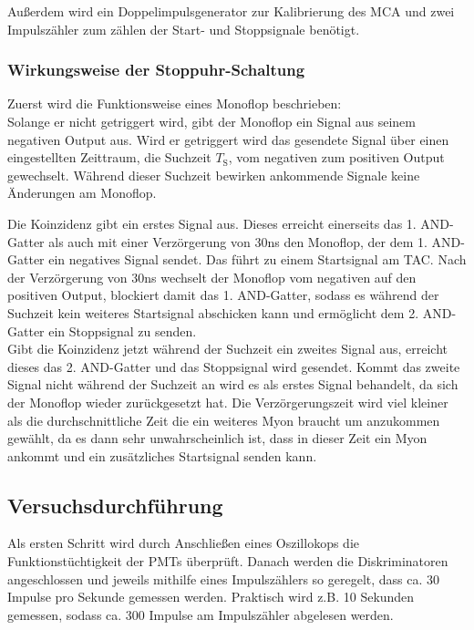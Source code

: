         Außerdem wird ein Doppelimpulsgenerator zur Kalibrierung des MCA und zwei Impulszähler zum zählen der Start- und Stoppsignale benötigt.

    \subsubsection*{Wirkungsweise der Stoppuhr-Schaltung}
        Zuerst wird die Funktionsweise eines Monoflop beschrieben: \\
        Solange er nicht getriggert wird, gibt der Monoflop ein Signal aus seinem negativen Output aus.
        Wird er getriggert wird das gesendete Signal über einen eingestellten Zeittraum, die Suchzeit $T_{\text{S}}$, vom negativen zum positiven Output gewechselt. Während dieser Suchzeit bewirken ankommende Signale keine Änderungen am Monoflop.

        Die Koinzidenz gibt ein erstes Signal aus. Dieses erreicht einerseits das 1. AND-Gatter als auch mit einer Verzörgerung von $30$ns den Monoflop, der dem 1. AND-Gatter ein negatives Signal sendet. Das führt zu einem Startsignal am TAC. Nach der Verzörgerung von $30$ns wechselt der Monoflop vom negativen auf den positiven Output, blockiert damit das 1. AND-Gatter, sodass es während der Suchzeit kein weiteres Startsignal abschicken kann und ermöglicht dem 2. AND-Gatter ein Stoppsignal zu senden. \\
        Gibt die Koinzidenz jetzt während der Suchzeit ein zweites Signal aus, erreicht dieses das 2. AND-Gatter und das Stoppsignal wird gesendet. Kommt das zweite Signal nicht während der Suchzeit an wird es als erstes Signal behandelt, da sich der Monoflop wieder zurückgesetzt hat. Die Verzörgerungszeit wird viel kleiner als die durchschnittliche Zeit die ein weiteres Myon braucht um anzukommen gewählt, da es dann sehr unwahrscheinlich ist, dass in dieser Zeit ein Myon ankommt und ein zusätzliches Startsignal senden kann.

    \subsection{Versuchsdurchführung}
        Als ersten Schritt wird durch Anschließen eines Oszillokops die Funktionstüchtigkeit der PMTs überprüft. Danach werden die Diskriminatoren angeschlossen und jeweils mithilfe eines Impulszählers so geregelt, dass ca. 30 Impulse pro Sekunde gemessen werden. Praktisch wird z.B. 10 Sekunden gemessen, sodass ca. 300 Impulse am Impulszähler abgelesen werden.

